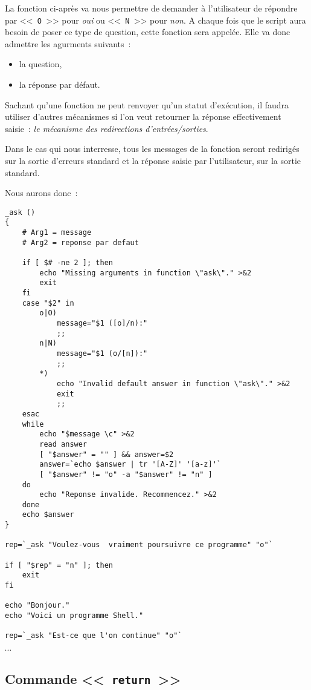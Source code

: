 \begin{example}
La fonction ci-apr{\`e}s va nous permettre de demander {\`a} l'utilisateur de r{\'e}pondre par
<<~\texttt{O}~>> pour {\sl oui} ou <<~\texttt{N}~>> pour {\sl non}. A chaque fois que le
script aura besoin de poser ce type de question, cette fonction sera appel{\'e}e. Elle
va donc admettre les agurments suivants~:
\begin{itemize}
	\item	la question,
	\item	la r{\'e}ponse par d{\'e}faut.
\end{itemize}

Sachant qu'une fonction ne peut renvoyer qu'un statut d'ex{\'e}cution, il faudra utiliser d'autres
m{\'e}canismes si l'on veut retourner la r{\'e}ponse effectivement saisie~: {\sl le m{\'e}canisme des
redirections d'entr{\'e}es/sorties}.

Dans le cas qui nous interresse, tous les messages de la fonction seront redirig{\'e}s sur la sortie
d'erreurs standard et la r{\'e}ponse saisie par l'utilisateur, sur la sortie standard.

Nous aurons donc~:

\begin{verbatim}
_ask ()
{
    # Arg1 = message
    # Arg2 = reponse par defaut

    if [ $# -ne 2 ]; then
        echo "Missing arguments in function \"ask\"." >&2
        exit
    fi
    case "$2" in
        o|O)
            message="$1 ([o]/n):"
            ;;
        n|N)
            message="$1 (o/[n]):"
            ;;
        *)
            echo "Invalid default answer in function \"ask\"." >&2
            exit
            ;;
    esac
    while
        echo "$message \c" >&2
        read answer
        [ "$answer" = "" ] && answer=$2
        answer=`echo $answer | tr '[A-Z]' '[a-z]'`
        [ "$answer" != "o" -a "$answer" != "n" ]
    do
        echo "Reponse invalide. Recommencez." >&2
    done
    echo $answer
}

rep=`_ask "Voulez-vous  vraiment poursuivre ce programme" "o"`

if [ "$rep" = "n" ]; then
    exit
fi

echo "Bonjour."
echo "Voici un programme Shell."

rep=`_ask "Est-ce que l'on continue" "o"`
\end{verbatim}
$\cdots$
\end{example}

\subsection{Commande <<~\texttt{return}~>>}


